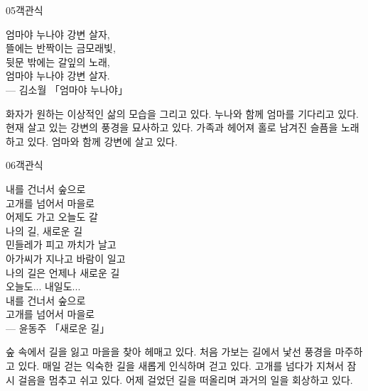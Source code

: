\documentclass[fs9,seriesRus]{korfarm-base}
\begin{document}
\begin{kfQBlock}{05}{객관식}
\begin{kfEvidence}엄마야 누나야 강변 살자, \\\relax
뜰에는 반짝이는 금모래빛, \\\relax
뒷문 밖에는 갈잎의 노래, \\\relax
엄마야 누나야 강변 살자. \\\relax
— 김소월 「엄마야 누나야」\end{kfEvidence}
\begin{kfChoices}
\kfChoice 화자가 원하는 이상적인 삶의 모습을 그리고 있다.
\kfChoice 누나와 함께 엄마를 기다리고 있다.
\kfChoice 현재 살고 있는 강변의 풍경을 묘사하고 있다.
\kfChoice 가족과 헤어져 홀로 남겨진 슬픔을 노래하고 있다.
\kfChoice 엄마와 함께 강변에 살고 있다.
\end{kfChoices}
\end{kfQBlock}
\begin{kfQBlock}{06}{객관식}
\begin{kfEvidence}내를 건너서 숲으로 \\\relax
고개를 넘어서 마을로 \\\relax
어제도 가고 오늘도 갈 \\\relax
나의 길, 새로운 길 \\\relax
민들레가 피고 까치가 날고 \\\relax
아가씨가 지나고 바람이 일고 \\\relax
나의 길은 언제나 새로운 길 \\\relax
오늘도... 내일도... \\\relax
내를 건너서 숲으로 \\\relax
고개를 넘어서 마을로 \\\relax
— 윤동주 「새로운 길」\end{kfEvidence}
\begin{kfChoices}
\kfChoice 숲 속에서 길을 잃고 마을을 찾아 헤매고 있다.
\kfChoice 처음 가보는 길에서 낯선 풍경을 마주하고 있다.
\kfChoice 매일 걷는 익숙한 길을 새롭게 인식하며 걷고 있다.
\kfChoice 고개를 넘다가 지쳐서 잠시 걸음을 멈추고 쉬고 있다.
\kfChoice 어제 걸었던 길을 떠올리며 과거의 일을 회상하고 있다.
\end{kfChoices}
\end{kfQBlock}
\end{document}
